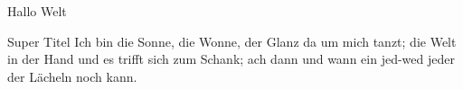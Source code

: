 \documentclass{article}
\begin{document}
    Hallo Welt

    \begin{definition}{Super Titel}
        Ich bin die Sonne, die Wonne, der Glanz da um mich tanzt; die Welt in der Hand und es trifft sich zum
        Schank; ach dann und wann ein jed-wed jeder der Lächeln noch kann.
    \end{definition}
\end{document}
